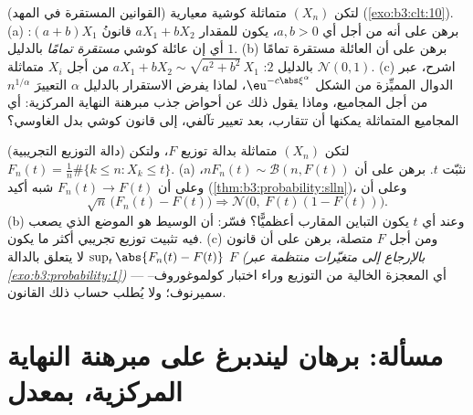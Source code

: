 \begin{exercise}[$\star\star$]\label{exo:b3:clt:11}
(القوانين المستقرة في المهد) لتكن $(X_n)$  متماثلة كوشية
معيارية (\cref{exo:b3:clt:10}).
(a) برهن على أنه من أجل أي $a, b > 0$، يكون للمقدار $aX_1 + bX_2$
قانونُ $(a + b)X_1$: أي إن عائلة كوشي \emph{مستقرة تمامًا}
بالدليل $1$.
(b) برهن على أن العائلة  مستقرة تمامًا بالدليل $2$:
$aX_1 + bX_2 \sim \sqrt{a^2 + b^2}\,X_1$ من أجل $X_i$  متماثلة $\mathcal N(0,1)$.
(c) اشرح، عبر الدوال المميِّزة من الشكل $\eu^{-c\abs\xi^\alpha}$، لماذا يفرض
الاستقرار بالدليل $\alpha$ التعييرَ $n^{1/\alpha}$ من أجل
المجاميع، وماذا يقول ذلك عن أحواض جذب مبرهنة النهاية المركزية:
أي المجاميع  المتماثلة يمكنها أن تتقارب، بعد تعيير
تآلفي، إلى قانون كوشي بدل الغاوسي؟
\end{exercise}

\begin{exercise}[$\star\star$]\label{exo:b3:clt:12}
(دالة التوزيع التجريبية) لتكن $(X_n)$  متماثلة بدالة
توزيع $F$، ولتكن $F_n(t) =
\frac1n\#\{k \leq n : X_k \leq t\}$.
(a) نثبّت $t$. برهن على أن $n F_n(t) \sim \mathcal B(n, F(t))$، وعلى أن $F_n(t) \to F(t)$ شبه أكيد
(\cref{thm:b3:probability:slln})، وعلى أن
\[
\sqrt n\,\bigl(F_n(t) - F(t)\bigr) \Longrightarrow
\mathcal N\bigl(0,\ F(t)(1 - F(t))\bigr) .
\]
(b) وعند أي $t$ يكون التباين المقارب أعظميًّا؟ فسّر: أن الوسيط
هو الموضع الذي يصعب فيه تثبيت توزيع تجريبي أكثر ما يكون.
(c) ومن أجل $F$ متصلة، برهن على أن قانون $\sup_t\abs{F_n(t) - F(t)}$ لا يتعلق
بالدالة $F$ \emph{(بالإرجاع إلى متغيّرات منتظمة عبر \cref{exo:b3:probability:1})}
--- أي المعجزة الخالية من التوزيع وراء اختبار
كولموغوروف--سميرنوف؛ ولا يُطلب حساب ذلك القانون.
\end{exercise}

\section{مسألة: برهان ليندبرغ على مبرهنة النهاية المركزية،
بمعدل}

